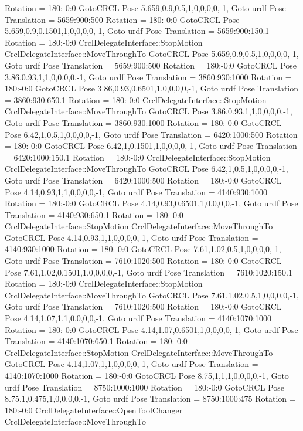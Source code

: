 \begin{DoxyVerb}
Rotation = 180:-0:0
GotoCRCL Pose 5.659,0.9,0.5,1,0,0,0,0,-1,
Goto urdf Pose Translation = 5659:900:500
Rotation = 180:-0:0
GotoCRCL Pose 5.659,0.9,0.1501,1,0,0,0,0,-1,
Goto urdf Pose Translation = 5659:900:150.1
Rotation = 180:-0:0
CrclDelegateInterface::StopMotion
CrclDelegateInterface::MoveThroughTo
GotoCRCL Pose 5.659,0.9,0.5,1,0,0,0,0,-1,
Goto urdf Pose Translation = 5659:900:500
Rotation = 180:-0:0
GotoCRCL Pose 3.86,0.93,1,1,0,0,0,0,-1,
Goto urdf Pose Translation = 3860:930:1000
Rotation = 180:-0:0
GotoCRCL Pose 3.86,0.93,0.6501,1,0,0,0,0,-1,
Goto urdf Pose Translation = 3860:930:650.1
Rotation = 180:-0:0
CrclDelegateInterface::StopMotion
CrclDelegateInterface::MoveThroughTo
GotoCRCL Pose 3.86,0.93,1,1,0,0,0,0,-1,
Goto urdf Pose Translation = 3860:930:1000
Rotation = 180:-0:0
GotoCRCL Pose 6.42,1,0.5,1,0,0,0,0,-1,
Goto urdf Pose Translation = 6420:1000:500
Rotation = 180:-0:0
GotoCRCL Pose 6.42,1,0.1501,1,0,0,0,0,-1,
Goto urdf Pose Translation = 6420:1000:150.1
Rotation = 180:-0:0
CrclDelegateInterface::StopMotion
CrclDelegateInterface::MoveThroughTo
GotoCRCL Pose 6.42,1,0.5,1,0,0,0,0,-1,
Goto urdf Pose Translation = 6420:1000:500
Rotation = 180:-0:0
GotoCRCL Pose 4.14,0.93,1,1,0,0,0,0,-1,
Goto urdf Pose Translation = 4140:930:1000
Rotation = 180:-0:0
GotoCRCL Pose 4.14,0.93,0.6501,1,0,0,0,0,-1,
Goto urdf Pose Translation = 4140:930:650.1
Rotation = 180:-0:0
CrclDelegateInterface::StopMotion
CrclDelegateInterface::MoveThroughTo
GotoCRCL Pose 4.14,0.93,1,1,0,0,0,0,-1,
Goto urdf Pose Translation = 4140:930:1000
Rotation = 180:-0:0
GotoCRCL Pose 7.61,1.02,0.5,1,0,0,0,0,-1,
Goto urdf Pose Translation = 7610:1020:500
Rotation = 180:-0:0
GotoCRCL Pose 7.61,1.02,0.1501,1,0,0,0,0,-1,
Goto urdf Pose Translation = 7610:1020:150.1
Rotation = 180:-0:0
CrclDelegateInterface::StopMotion
CrclDelegateInterface::MoveThroughTo
GotoCRCL Pose 7.61,1.02,0.5,1,0,0,0,0,-1,
Goto urdf Pose Translation = 7610:1020:500
Rotation = 180:-0:0
GotoCRCL Pose 4.14,1.07,1,1,0,0,0,0,-1,
Goto urdf Pose Translation = 4140:1070:1000
Rotation = 180:-0:0
GotoCRCL Pose 4.14,1.07,0.6501,1,0,0,0,0,-1,
Goto urdf Pose Translation = 4140:1070:650.1
Rotation = 180:-0:0
CrclDelegateInterface::StopMotion
CrclDelegateInterface::MoveThroughTo
GotoCRCL Pose 4.14,1.07,1,1,0,0,0,0,-1,
Goto urdf Pose Translation = 4140:1070:1000
Rotation = 180:-0:0
GotoCRCL Pose 8.75,1,1,1,0,0,0,0,-1,
Goto urdf Pose Translation = 8750:1000:1000
Rotation = 180:-0:0
GotoCRCL Pose 8.75,1,0.475,1,0,0,0,0,-1,
Goto urdf Pose Translation = 8750:1000:475
Rotation = 180:-0:0
CrclDelegateInterface::OpenToolChanger
CrclDelegateInterface::MoveThroughTo

\end{DoxyVerb}
